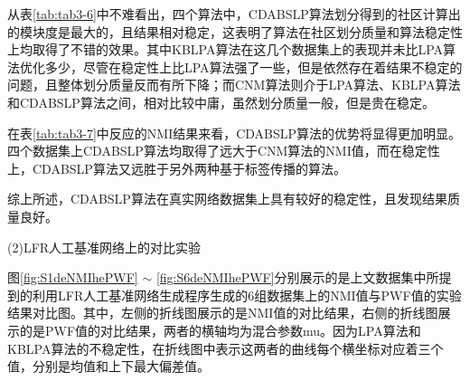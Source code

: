从表\ref{tab:tab3-6}中不难看出，四个算法中，CDABSLP算法划分得到的社区计算出的模块度是最大的，且结果相对稳定，这表明了算法在社区划分质量和算法稳定性上均取得了不错的效果。其中KBLPA算法在这几个数据集上的表现并未比LPA算法优化多少，尽管在稳定性上比LPA算法强了一些，但是依然存在着结果不稳定的问题，且整体划分质量反而有所下降；而CNM算法则介于LPA算法、KBLPA算法和CDABSLP算法之间，相对比较中庸，虽然划分质量一般，但是贵在稳定。

在表\ref{tab:tab3-7}中反应的NMI结果来看，CDABSLP算法的优势将显得更加明显。四个数据集上CDABSLP算法均取得了远大于CNM算法的NMI值，而在稳定性上，CDABSLP算法又远胜于另外两种基于标签传播的算法。

综上所述，CDABSLP算法在真实网络数据集上具有较好的稳定性，且发现结果质量良好。

(2)LFR人工基准网络上的对比实验

图\ref{fig:S1deNMIhePWF} $\sim$ \ref{fig:S6deNMIhePWF}分别展示的是上文数据集中所提到的利用LFR人工基准网络生成程序生成的6组数据集上的NMI值与PWF值的实验结果对比图。其中，左侧的折线图展示的是NMI值的对比结果，右侧的折线图展示的是PWF值的对比结果，两者的横轴均为混合参数mu。因为LPA算法和KBLPA算法的不稳定性，在折线图中表示这两者的曲线每个横坐标对应着三个值，分别是均值和上下最大偏差值。

